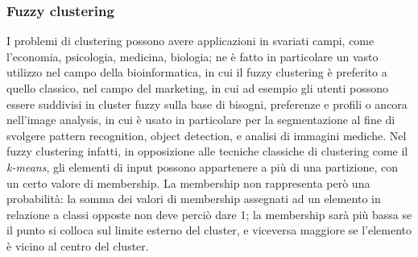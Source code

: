 \documentclass{article}
\begin{document}
	\subsubsection{Fuzzy clustering}
		I problemi di clustering possono avere applicazioni in svariati campi, come l'economia, psicologia, medicina, biologia; ne è fatto in particolare un vasto utilizzo nel campo della bioinformatica, in cui il fuzzy clustering è preferito a quello classico, nel campo del marketing, in cui ad esempio gli utenti possono essere suddivisi in cluster fuzzy sulla base di bisogni, preferenze e profili o ancora nell'image analysis, in cui è usato in particolare per la segmentazione al fine di svolgere pattern recognition, object detection, e analisi di immagini mediche.
		Nel fuzzy clustering infatti, in opposizione alle tecniche classiche di clustering come il \textit{k-means}, gli elementi di input possono appartenere a più di una partizione, con un certo valore di membership. La membership non rappresenta però una probabilità: la somma dei valori di membership assegnati ad un elemento in relazione a classi opposte non deve perciò dare 1; la membership sarà più bassa se il punto si colloca sul limite esterno del cluster, e viceversa maggiore se l'elemento è vicino al centro del cluster.
		
\end{document}
